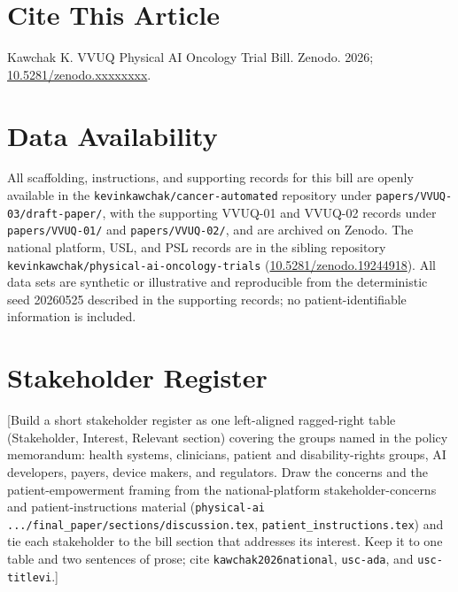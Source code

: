 \section*{Cite This Article}
\label{sec:cite}

Kawchak K. VVUQ Physical AI Oncology Trial Bill. Zenodo. 2026;
\href{https://doi.org/10.5281/zenodo.xxxxxxxx}{10.5281/zenodo.xxxxxxxx}.

{}
\section*{Data Availability}
\label{sec:data}

All scaffolding, instructions, and supporting records for this bill are openly
available in the \texttt{kevinkawchak/cancer-automated} repository under
\texttt{papers/VVUQ-03/draft-paper/}, with the supporting VVUQ-01 and VVUQ-02
records under \texttt{papers/VVUQ-01/} and \texttt{papers/VVUQ-02/}, and are
archived on Zenodo. The national platform, USL, and PSL records are in the sibling
repository \texttt{kevinkawchak/physical-ai-oncology-trials}
(\href{https://doi.org/10.5281/zenodo.19244918}{10.5281/zenodo.19244918}). All
data sets are synthetic or illustrative and reproducible from the deterministic
seed 20260525 described in the supporting records; no patient-identifiable
information is included.

{}
\section*{Stakeholder Register}
\label{sec:stakeholders}

[Build a short stakeholder register as one left-aligned ragged-right table
(Stakeholder, Interest, Relevant section) covering the groups named in the policy
memorandum: health systems, clinicians, patient and disability-rights groups, AI
developers, payers, device makers, and regulators. Draw the concerns and the
patient-empowerment framing from the national-platform stakeholder-concerns and
patient-instructions material
(\texttt{physical-ai .../final\_paper/sections/discussion.tex},
\texttt{patient\_instructions.tex}) and tie each stakeholder to the bill section
that addresses its interest. Keep it to one table and two sentences of prose;
cite \texttt{kawchak2026national}, \texttt{usc-ada}, and \texttt{usc-titlevi}.]
